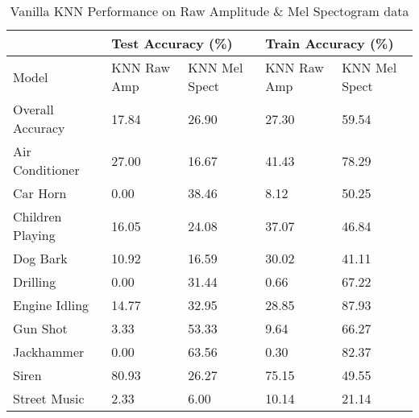 \documentclass[11pt]{article}
\begin{document}
\begin{table}[h!]
\centering
\begin{tabular}{lllll}
                 & \multicolumn{2}{l}{Test Accuracy (\%)} & \multicolumn{2}{l}{Train Accuracy (\%)} \\ \toprule
Model            & KNN Raw Amp       & KNN Mel Spect      & KNN Raw Amp       & KNN Mel Spect       \\ \toprule
Overall Accuracy & 17.84             & 26.90              & 27.30             & 59.54               \\ \midrule
Air Conditioner  & 27.00             & 16.67              & 41.43             & 78.29               \\
Car Horn         & 0.00              & 38.46              & 8.12              & 50.25               \\
Children Playing & 16.05             & 24.08              & 37.07             & 46.84               \\
Dog Bark         & 10.92             & 16.59              & 30.02             & 41.11               \\
Drilling         & 0.00              & 31.44              & 0.66              & 67.22               \\
Engine Idling    & 14.77             & 32.95              & 28.85             & 87.93               \\
Gun Shot         & 3.33              & 53.33              & 9.64              & 66.27               \\
Jackhammer       & 0.00              & 63.56              & 0.30              & 82.37               \\
Siren            & 80.93             & 26.27              & 75.15             & 49.55               \\
Street Music     & 2.33              & 6.00               & 10.14             & 21.14               \\ \bottomrule
\end{tabular}

\caption{\label{tab:3} Vanilla KNN Performance on Raw Amplitude \& Mel Spectogram data}
\end{table}
\end{document}
